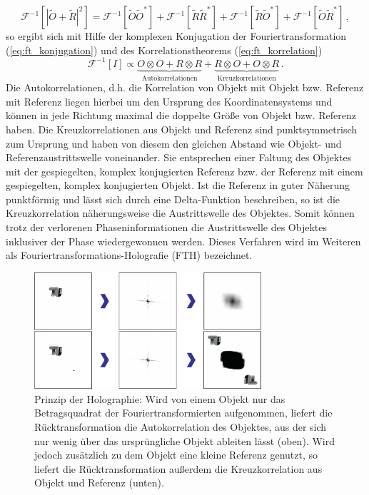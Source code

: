\begin{equation}
	\mathscr{F}^{-1}\left[\left|\tilde{O}+\tilde{R}\right|^2\right]=
	\mathscr{F}^{-1}\left[\tilde{O}\tilde{O}^*\right]+
	\mathscr{F}^{-1}\left[\tilde{R}\tilde{R}^*\right]+
	\mathscr{F}^{-1}\left[\tilde{R}\tilde{O}^*\right]+
	\mathscr{F}^{-1}\left[\tilde{O}\tilde{R}^*\right]\,,
\end{equation}
so ergibt sich mit Hilfe der komplexen Konjugation der Fouriertransformation (\ref{eq:ft_konjugation}) und des Korrelationstheorems (\ref{eq:ft_korrelation})
\begin{equation}
	\mathscr{F}^{-1}[I]\propto \underbrace{O \otimes O + R\otimes R}_{\text{Autokorrelationen}}+\underbrace{R\otimes O+ O\otimes R}_{\text {Kreuzkorrelationen}}\,.
\end{equation}
Die Autokorrelationen, d.h. die Korrelation von Objekt mit Objekt bzw. Referenz mit Referenz liegen hierbei um den Ursprung des Koordinatensystems und können in jede Richtung maximal die doppelte Größe von Objekt bzw. Referenz haben. Die Kreuzkorrelationen aus Objekt und Referenz sind punktsymmetrisch zum Ursprung und haben von diesem den gleichen Abstand wie Objekt- und Referenzaustrittswelle voneinander.
Sie  entsprechen einer Faltung des Objektes mit der gespiegelten, komplex konjugierten Referenz bzw. der Referenz mit einem gespiegelten, komplex konjugierten Objekt.  Ist die Referenz in guter Näherung punktförmig und lässt sich durch eine Delta-Funktion beschreiben, so ist die Kreuzkorrelation näherungsweise die Austrittswelle des Objektes. Somit können trotz der verlorenen Phaseninformationen die Austrittswelle des Objektes inklusiver der Phase wiedergewonnen werden. Dieses Verfahren wird im Weiteren als Fouriertransformations-Holografie (FTH) bezeichnet.

\begin{figure}
	\centering
	\includegraphics[width=0.75\textwidth]{images/fth.pdf}
	\caption[Prinzip FTP]{Prinzip der Holographie: Wird von einem Objekt nur das Betragsquadrat der Fouriertransformierten aufgenommen, liefert die Rücktransformation die Autokorrelation des Objektes, aus der sich nur wenig über das ursprüngliche Objekt ableiten lässt (oben). Wird jedoch zusätzlich zu dem Objekt eine kleine Referenz genutzt, so liefert die Rücktransformation außerdem die Kreuzkorrelation aus Objekt und Referenz (unten).}
	\label{fig:fth}
\end{figure}

